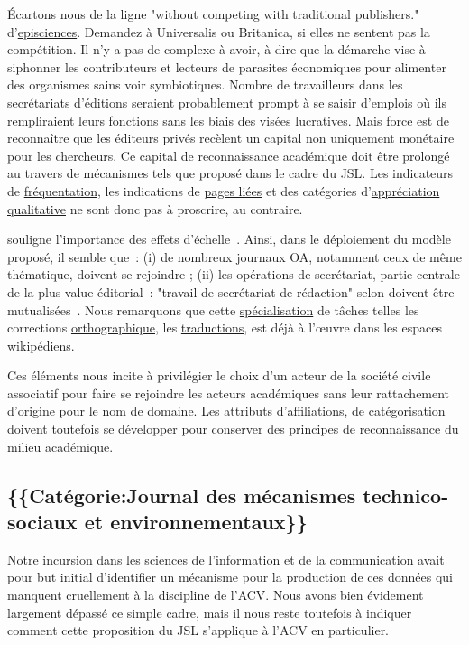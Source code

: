 Écartons nous de la ligne "without competing with traditional publishers." d'\href{http://episciences.org}{episciences}.
Demandez à Universalis ou Britanica, si elles ne sentent pas la compétition.
Il n'y a pas de complexe à avoir, à dire que la démarche vise à siphonner les contributeurs et lecteurs de parasites économiques pour alimenter des organismes sains voir symbiotiques.
Nombre de travailleurs dans les secrétariats d'éditions seraient probablement prompt à se saisir d'emplois où ils rempliraient leurs fonctions sans les biais des visées lucratives.
Mais force est de reconnaître que les éditeurs privés recèlent un capital non uniquement monétaire pour les chercheurs.
Ce capital de reconnaissance académique doit être prolongé au travers de mécanismes tels que proposé dans le cadre du \gls{JSL}.
Les indicateurs de \href{https://tools.wmflabs.org/pageviews/?project=fr.wikipedia.org&platform=all-access&agent=user&range=latest-20&pages=Coefficient_de_Gini}{fréquentation}, les indications de  \href{https://fr.wikipedia.org/w/index.php?title=Spécial:Pages_liées/Philosophie&hideredirs=1&hidetrans=1}{pages liées} et des catégories d'\href{https://fr.wikipedia.org/wiki/Catégorie:Article_de_qualité}{appréciation qualitative} ne sont donc pas à proscrire, au contraire.

\citeauthor{frantsvag_size_2010} souligne l'importance des effets d'échelle~\cite{frantsvag_size_2010}.
Ainsi, dans le déploiement du modèle proposé, il semble que~:
(i) de nombreux journaux OA, notamment ceux de même thématique, doivent se rejoindre ;
(ii) les opérations de secrétariat, partie centrale de la plus-value éditorial~: "travail de secrétariat de rédaction" selon \citeauthor{contat_publier_2015} doivent être mutualisées~\cite{contat_publier_2015}.
Nous remarquons que cette \href{https://fr.wikipedia.org/wiki/Catégorie:Icône_de_titre/Utilisateur/Statut}{spécialisation} de tâches telles les corrections \href{https://fr.wikipedia.org/wiki/Catégorie:Utilisateur_Orthographe}{orthographique}, les \href{https://fr.wikipedia.org/wiki/Catégorie:Utilisateur_Traduction}{traductions}, est déjà à l’œuvre dans les espaces wikipédiens.

Ces éléments nous incite à privilégier le choix d'un acteur de la société civile associatif pour faire se rejoindre les acteurs académiques sans leur rattachement d'origine pour le nom de domaine.
Les attributs d'affiliations, de catégorisation doivent toutefois se développer pour conserver des principes de reconnaissance du milieu académique.

\subsection{\{\{Catégorie:Journal des mécanismes technico-sociaux et environnementaux\}\}}
Notre incursion dans les sciences de l'information et de la communication avait pour but initial d'identifier un mécanisme pour la production de ces données qui manquent cruellement à la discipline de l'\gls{ACV}.
Nous avons bien évidement largement dépassé ce simple cadre, mais il nous reste toutefois à indiquer comment cette proposition du JSL s'applique à l'ACV en particulier.

